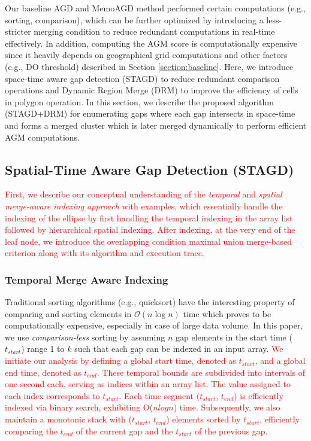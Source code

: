 \documentclass[acmsmall]{acmart}
\begin{document}
Our baseline AGD and MemoAGD method performed certain computations (e.g., sorting, comparison), which can be further optimized by introducing a less-stricter merging condition to reduce redundant computations in real-time effectively. In addition, computing the AGM score is computationally expensive since it heavily depends on geographical grid computations and other factors (e.g., DO threshold) described in Section \ref{section:baseline}. Here, we introduce space-time aware gap detection (STAGD) to reduce redundant comparison operations and Dynamic Region Merge (DRM) to improve the efficiency of cells in polygon operation. In this section, we describe the proposed algorithm (STAGD+DRM) for enumerating gaps where each gap intersects in space-time and forms a merged cluster which is later merged dynamically to perform efficient AGM computations.

\subsection{Spatial-Time Aware Gap Detection (STAGD)}
\label{subsection:RTree}

\textcolor{red}{First, we describe our conceptual understanding of the \textit{temporal} and \textit{spatial merge-aware indexing approach} with examples, which essentially handle the indexing of the ellipse by first handling the temporal indexing in the array list followed by hierarchical spatial indexing. After indexing, at the very end of the leaf node, we introduce the overlapping condition maximal union merge-based criterion along with its algorithm and execution trace.} %

\subsubsection{Temporal Merge Aware Indexing}
\label{subsubsection:Time based indexing}

Traditional sorting algorithms (e.g., quicksort) have the interesting property of comparing and sorting elements in $\mathcal{O}(n\log{}n)$ time which proves to be computationally expensive, especially in case of large data volume. In this paper, we use \textit{comparison-less} sorting by assuming $n$ gap elements in the start time ($t_{start}$) range 1 to $k$ such that each gap can be indexed in an input array. \textcolor{red}{We initiate our analysis by defining a global start time, denoted as $t_{start}$, and a global end time, denoted as $t_{end}$. These temporal bounds are subdivided into intervals of one second each, serving as indices within an array list. The value assigned to each index corresponds to $t_{start}$. Each time segment ($t_{start}$, $t_{end}$) is efficiently indexed via binary search, exhibiting O($nlogn$) time. Subsequently, we also maintain a monotonic stack with ($t_{start}$, $t_{end}$) elements sorted by $t_{start}$, efficiently comparing the $t_{end}$ of the current gap and the $t_{start}$ of the previous gap.}
\end{document}

